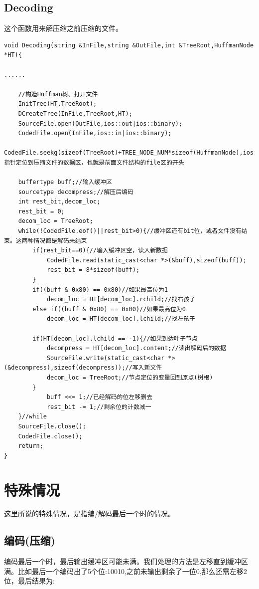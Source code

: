 \documentclass[a4paper]{ctexart}
\begin{document}
\subsection{Decoding}
这个函数用来解压缩之前压缩的文件。

\begin{lstlisting}
void Decoding(string &InFile,string &OutFile,int &TreeRoot,HuffmanNode *HT){

......

	//构造Huffman树、打开文件
	InitTree(HT,TreeRoot);
	DCreateTree(InFile,TreeRoot,HT);
	SourceFile.open(OutFile,ios::out|ios::binary);
	CodedFile.open(InFile,ios::in|ios::binary);
	CodedFile.seekg(sizeof(TreeRoot)+TREE_NODE_NUM*sizeof(HuffmanNode),ios::beg);//指针定位到压缩文件的数据区，也就是前面文件结构的file区的开头
	
	buffertype buff;//输入缓冲区
	sourcetype decompress;//解压后编码
	int rest_bit,decom_loc;
	rest_bit = 0;
	decom_loc = TreeRoot;
	while(!CodedFile.eof()||rest_bit>0){//缓冲区还有bit位，或者文件没有结束。这两种情况都是解码未结束
		if(rest_bit==0){//输入缓冲区空，读入新数据
			CodedFile.read(static_cast<char *>(&buff),sizeof(buff));
			rest_bit = 8*sizeof(buff);
		}
		if((buff & 0x80) == 0x80)//如果最高位为1
			decom_loc = HT[decom_loc].rchild;//找右孩子
		else if((buff & 0x80) == 0x00)//如果最高位为0
			decom_loc = HT[decom_loc].lchild;//找左孩子

		if(HT[decom_loc].lchild == -1){//如果到达叶子节点
			decompress = HT[decom_loc].content;//读出解码后的数据
			SourceFile.write(static_cast<char *>(&decompress),sizeof(decompress));//写入新文件
			decom_loc = TreeRoot;//节点定位的变量回到原点(树根)
		}
			buff <<= 1;//已经解码的位左移删去
			rest_bit -= 1;//剩余位的计数减一
	}//while
	SourceFile.close();
	CodedFile.close();
	return;
}
\end{lstlisting}

\section{特殊情况}

这里所说的特殊情况，是指编/解码最后一个时的情况。

\subsection{编码(压缩)}

编码最后一个时，最后输出缓冲区可能未满。我们处理的方法是左移直到缓冲区满。比如最后一个编码出了5个位:10010,之前未输出剩余了一位0,那么还需左移2位，最后结果为:
\end{document}
